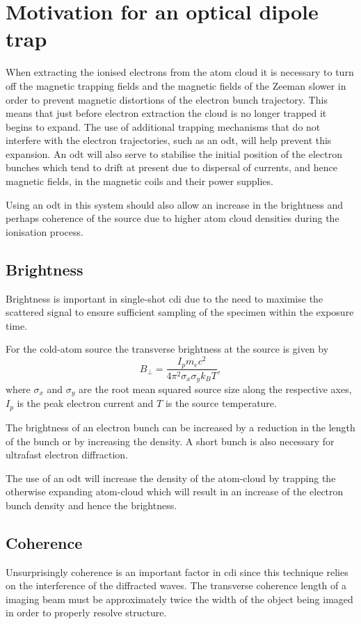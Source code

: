 \section{Motivation for an optical dipole trap}

When extracting the ionised electrons from the atom cloud it is necessary to turn off the magnetic trapping fields and the magnetic fields of the Zeeman slower in order to prevent magnetic distortions of the electron bunch trajectory. This means that just before electron extraction the cloud is no longer trapped it begins to expand. The use of additional trapping mechanisms that do not interfere with the electron trajectories, such as an \gls{odt}, will help prevent this expansion. An \gls{odt} will also serve to stabilise the initial position of the electron bunches which tend to drift at present due to dispersal of currents, and hence magnetic fields, in the magnetic coils and their power supplies.

Using an \gls{odt} in this system should also allow an increase in the brightness and perhaps coherence of the source due to higher atom cloud densities during the ionisation process.

\subsection{Brightness}
Brightness is important in single-shot \gls{cdi} due to the need to maximise the scattered signal to ensure sufficient sampling of the specimen within the exposure time.

For the cold-atom source the transverse brightness at the source is given by\cite{reiser_theory_2008}
\begin{equation}
B_\perp = \frac{I_p m_e c^2}{4 \pi^2 \sigma_x \sigma_y k_B T},
\end{equation}
where $\sigma_x$ and $\sigma_y$ are the root mean squared source size along the respective axes, $I_p$ is the peak electron current and $T$ is the source temperature.

The brightness of an electron bunch can be increased by a reduction in the length of the bunch or by increasing the density. A short bunch is also necessary for ultrafast electron diffraction.

The use of an \gls{odt} will increase the density of the atom-cloud by trapping the otherwise expanding atom-cloud which will result in an increase of the electron bunch density and hence the brightness.

\subsection{Coherence}
Unsurprisingly coherence is an important factor in \gls{cdi} since this technique relies on the interference of the diffracted waves. The transverse coherence length of a imaging beam must be approximately twice the width of the object being imaged\cite{spence_coherence_2004} in order to properly resolve structure.


